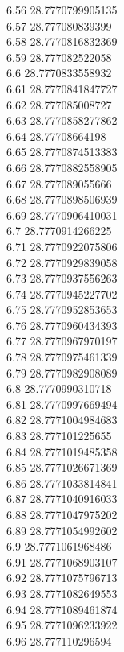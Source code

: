 {6.56	28.7770799905135\\
6.57	28.777080839399\\
6.58	28.7770816832369\\
6.59	28.777082522058\\
6.6	28.7770833558932\\
6.61	28.7770841847727\\
6.62	28.777085008727\\
6.63	28.7770858277862\\
6.64	28.77708664198\\
6.65	28.7770874513383\\
6.66	28.7770882558905\\
6.67	28.777089055666\\
6.68	28.7770898506939\\
6.69	28.7770906410031\\
6.7	28.7770914266225\\
6.71	28.7770922075806\\
6.72	28.7770929839058\\
6.73	28.7770937556263\\
6.74	28.7770945227702\\
6.75	28.7770952853653\\
6.76	28.7770960434393\\
6.77	28.7770967970197\\
6.78	28.7770975461339\\
6.79	28.7770982908089\\
6.8	28.7770990310718\\
6.81	28.7770997669494\\
6.82	28.7771004984683\\
6.83	28.777101225655\\
6.84	28.7771019485358\\
6.85	28.7771026671369\\
6.86	28.7771033814841\\
6.87	28.7771040916033\\
6.88	28.7771047975202\\
6.89	28.7771054992602\\
6.9	28.7771061968486\\
6.91	28.7771068903107\\
6.92	28.7771075796713\\
6.93	28.7771082649553\\
6.94	28.7771089461874\\
6.95	28.7771096233922\\
6.96	28.777110296594\\
}
